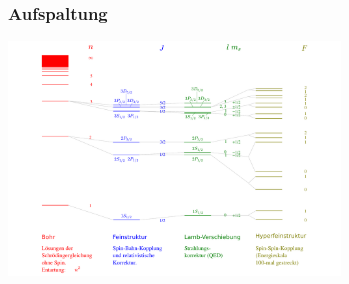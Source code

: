 %
%
%
\bgroup
\begin{frame}[t]
\setlength{\abovedisplayskip}{5pt}
\setlength{\belowdisplayskip}{5pt}
\frametitle{Aufspaltung}
\begin{center}
\includegraphics[width=0.66\textwidth]{../slides/6/punktgruppen/WasserstoffAufspaltung.pdf}
\end{center}
\end{frame}
\egroup
